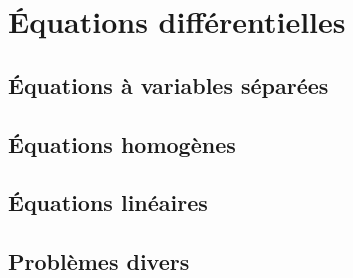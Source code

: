
\section{Équations différentielles}

\subsection{Équations à variables séparées}


\subsection{Équations homogènes}


\subsection{Équations linéaires}


\subsection{Problèmes divers}


